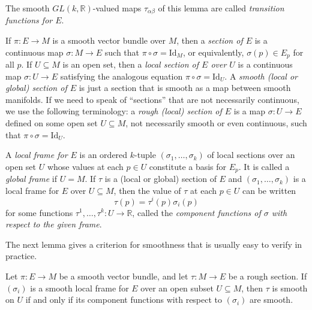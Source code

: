The smooth $GL(k, \mathbb{R})$-valued maps $\tau_{\alpha\beta}$ of this lemma are called \textit{transition functions for $E$}.

If $\pi: E \to M$ is a smooth vector bundle over $M$, then a \textit{section of $E$} is a continuous map $\sigma: M \to E$ such that $\pi \circ \sigma = \text{Id}_M$, or equivalently, $\sigma(p) \in E_p$ for all $p$. If $U \subseteq M$ is an open set, then a \textit{local section of $E$ over $U$} is a continuous map $\sigma: U \to E$ satisfying the analogous equation $\pi \circ \sigma = \text{Id}_U$. A \textit{smooth (local or global) section of $E$} is just a section that is smooth as a map between smooth manifolds. If we need to speak of ``sections'' that are not necessarily continuous, we use the following terminology: a \textit{rough (local) section of $E$} is a map $\sigma: U \to E$ defined on some open set $U \subseteq M$, not necessarily smooth or even continuous, such that $\pi \circ \sigma = \text{Id}_U$.

A \textit{local frame for $E$} is an ordered $k$-tuple $(\sigma_1, \ldots, \sigma_k)$ of local sections over an open set $U$ whose values at each $p \in U$ constitute a basis for $E_p$. It is called a \textit{global frame} if $U = M$. If $\tau$ is a (local or global) section of $E$ and $(\sigma_1, \ldots, \sigma_k)$ is a local frame for $E$ over $U \subseteq M$, then the value of $\tau$ at each $p \in U$ can be written
\begin{equation*}
\tau(p) = \tau^i(p)\sigma_i(p)
\end{equation*}
for some functions $\tau^1, \ldots, \tau^k: U \to \mathbb{R}$, called the \textit{component functions of $\sigma$ with respect to the given frame}.

The next lemma gives a criterion for smoothness that is usually easy to verify in practice.

\begin{lemma}
\label{lem:local-frame-criterion-for-smoothness}
\leanok
{}
Let $\pi: E \to M$ be a smooth vector bundle, and let $\tau: M \to E$ be a rough section. If $(\sigma_i)$ is a smooth local frame for $E$ over an open subset $U \subseteq M$, then $\tau$ is smooth on $U$ if and only if its component functions with respect to $(\sigma_i)$ are smooth.
\end{lemma}

